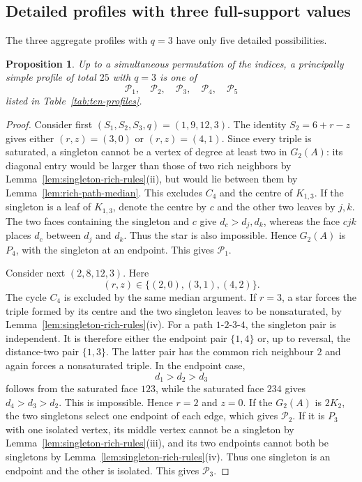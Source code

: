 \documentclass[11pt,a4paper]{article}
\newtheorem{proposition}[theorem]{Proposition}
\theoremstyle{definition}
\begin{document}
\subsection{Detailed profiles with three full-support values}

The three aggregate profiles with $q=3$ have only five detailed
possibilities.

\begin{proposition}
\label{prop:q-three-classification}
Up to a simultaneous permutation of the indices, a principally simple
profile of total $25$ with $q=3$ is one of
$$
\mathcal P_1,\quad
\mathcal P_2,\quad
\mathcal P_3,\quad
\mathcal P_4,\quad
\mathcal P_5
$$
listed in Table~\ref{tab:ten-profiles}.
\end{proposition}

\begin{proof}
Consider first $(S_1,S_2,S_3,q)=(1,9,12,3)$. The identity
$S_2=6+r-z$ gives either
$(r,z)=(3,0)$ or $(r,z)=(4,1)$. Since every triple is saturated, a
singleton cannot be a vertex of degree at least two in $G_2(A)$:
its diagonal entry would be larger than those of two rich neighbors by
Lemma~\ref{lem:singleton-rich-rules}\textup{(ii)}, but would lie between
them by Lemma~\ref{lem:rich-path-median}. This excludes $C_4$ and the
centre of $K_{1,3}$. If the singleton is a leaf of $K_{1,3}$, denote the
centre by $c$ and the other two leaves by $j,k$. The two faces containing
the singleton and $c$ give $d_c>d_j,d_k$, whereas the face $cjk$ places
$d_c$ between $d_j$ and $d_k$. Thus the star is also impossible. Hence
$G_2(A)$ is $P_4$, with the singleton at an endpoint. This gives
$\mathcal P_1$.

Consider next $(2,8,12,3)$. Here
$$
(r,z)\in\{(2,0),(3,1),(4,2)\}.
$$
The cycle $C_4$ is excluded by the same median argument. If $r=3$, a
star forces the triple formed by its centre and the two singleton leaves
to be nonsaturated, by
Lemma~\ref{lem:singleton-rich-rules}\textup{(iv)}. For a path
$1$-$2$-$3$-$4$, the singleton pair is independent. It is therefore
either the endpoint pair $\{1,4\}$ or, up to reversal, the distance-two
pair $\{1,3\}$. The latter pair has the common rich neighbour $2$ and
again forces a nonsaturated triple. In the endpoint case,
$$
d_1>d_2>d_3
$$
follows from the saturated face $123$, while the saturated face $234$
gives $d_4>d_3>d_2$. This is impossible. Hence $r=2$ and $z=0$. If the
$G_2(A)$ is $2K_2$, the two singletons select one endpoint of each
edge, which gives $\mathcal P_2$. If it is $P_3$ with one isolated
vertex, its
middle vertex cannot be a singleton by
Lemma~\ref{lem:singleton-rich-rules}\textup{(iii)}, and its two endpoints
cannot both be singletons by
Lemma~\ref{lem:singleton-rich-rules}\textup{(iv)}. Thus one singleton is
an endpoint and the other is isolated. This gives $\mathcal P_3$.


\end{proof}
\end{document}
